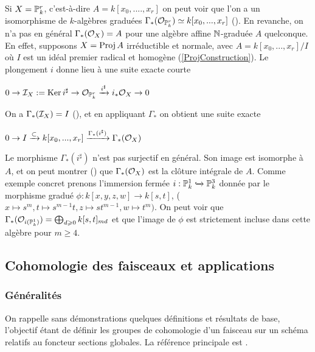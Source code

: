 \begin{rem}
Si $X=\mathbb{P}_k^r$, c'est-à-dire $A=k[x_0,....,x_r]$ on peut voir que l'on a un isomorphisme de $k$-algèbres graduées $\Gamma_*(\mathcal{O}_{\mathbb{P}_k^r})\simeq k[x_0,...,x_r]$ (\cite[II.5.13]{Hartshorne}). En revanche, on n'a pas en général $\Gamma_*(\mathcal{O}_X)=A$ pour une algèbre affine $\mathbb{N}$-graduée $A$ quelconque. En effet, supposons $X=\operatorname{Proj} A$ irréductible et normale, avec $A=k[x_0,...,x_r]/I$ où $I$ est un idéal premier radical et homogène (\ref{ProjConstruction}). Le plongement $i$ donne lieu à une suite exacte courte
\begin{center}
$0\rightarrow\mathcal{I}_X:=\operatorname{Ker} i^\sharp\rightarrow\mathcal{O}_{\mathbb{P}_k^r}\xrightarrow{i^\sharp}i_*\mathcal{O}_X\rightarrow 0$
\end{center}
On a $\Gamma_*(\mathcal{I}_X)=I$ (\cite[ex II.5.10]{Hartshorne}), et en appliquant $\Gamma_*$ on obtient une suite exacte
\begin{center}
$0\rightarrow I \xrightarrow{\subset} k[x_0,...,x_r]\xrightarrow{\Gamma_*(i^\sharp)}\Gamma_*(\mathcal{O}_X)$
\end{center}

Le morphisme $\Gamma_*(i^\sharp)$ n'est pas surjectif en général. Son image est isomorphe à $A$, et on peut montrer (\cite[II ex 5.14]{Hartshorne}) que $\Gamma_*(\mathcal{O}_X)$ est la clôture intégrale de $A$. Comme exemple concret prenons l'immersion fermée $i:\mathbb{P}_k^1\xhookrightarrow{}\mathbb{P}_k^3$ donnée par le morphisme gradué $\phi:k[x,y,z,w]\rightarrow k[s,t]$, ($x\mapsto s^m, t\mapsto s^{m-1}t, z\mapsto st^{m-1},w\mapsto t^m)$. On peut voir que $\Gamma_*(\mathcal{O}_{i(\mathbb{P}_k^1)})=\bigoplus_{d\geqslant 0}k[s,t]_{md}$ et que l'image de $\phi$ est strictement incluse dans cette algèbre pour $m\geq 4$.

\end{rem}

\subsection{Cohomologie des faisceaux et applications}
\label{Cohomologie}
\subsubsection{Généralités}

On rappelle sans démonstrations quelques définitions et résultats de base, l'objectif étant de définir les groupes de cohomologie d'un faisceau sur un schéma relatifs au foncteur sections globales. La référence principale est \cite[chap III]{Hartshorne}.\\

